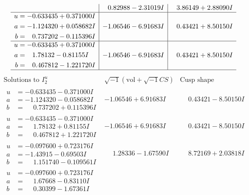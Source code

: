 \documentclass[1p]{elsarticle_modified}
\theoremstyle{definition}
\newcommand{\I}{\sqrt{-1}}
\begin{document}
$$\begin{array}{c|c|c}
 & \phantom{-}0.82988 - 2.31019 I & \phantom{-}3.86149 + 2.88090 I \\ \hline\begin{aligned}
u &= -0.633435 + 0.371000 I \\
a &= -1.124320 + 0.058682 I \\
b &= \phantom{-}0.737202 - 0.115396 I\end{aligned}
 & -1.06546 - 6.91683 I & \phantom{-}0.43421 + 8.50150 I \\ \hline\begin{aligned}
u &= -0.633435 + 0.371000 I \\
a &= \phantom{-}1.78132 - 0.81155 I \\
b &= \phantom{-}0.467812 - 1.221720 I\end{aligned}
 & -1.06546 - 6.91683 I & \phantom{-}0.43421 + 8.50150 I\\
 \hline 
 \end{array}$$\newpage$$\begin{array}{c|c|c}  
\text{Solutions to }I^u_{2}& \I (\text{vol} + \sqrt{-1}CS) & \text{Cusp shape}\\
 \hline 
\begin{aligned}
u &= -0.633435 - 0.371000 I \\
a &= -1.124320 - 0.058682 I \\
b &= \phantom{-}0.737202 + 0.115396 I\end{aligned}
 & -1.06546 + 6.91683 I & \phantom{-}0.43421 - 8.50150 I \\ \hline\begin{aligned}
u &= -0.633435 - 0.371000 I \\
a &= \phantom{-}1.78132 + 0.81155 I \\
b &= \phantom{-}0.467812 + 1.221720 I\end{aligned}
 & -1.06546 + 6.91683 I & \phantom{-}0.43421 - 8.50150 I \\ \hline\begin{aligned}
u &= -0.097600 + 0.723176 I \\
a &= -1.43915 - 0.69503 I \\
b &= \phantom{-}1.151740 - 0.109561 I\end{aligned}
 & \phantom{-}1.28336 - 1.67590 I & \phantom{-}8.72169 + 2.03818 I \\ \hline\begin{aligned}
u &= -0.097600 + 0.723176 I \\
a &= \phantom{-}1.67668 - 0.83110 I \\
b &= \phantom{-}0.30399 - 1.67361 I\end{aligned}

\end{array}$$
\end{document}

